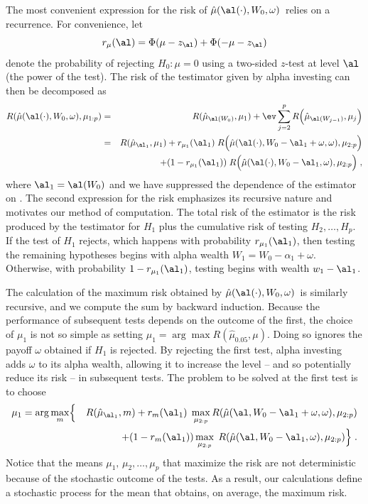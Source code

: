 \documentclass[12pt]{article}
\newcommand{\test}{\mbox{$\hat\mu(\al(\cdot),W_0,\omega)$}}
\begin{document}
 The most convenient expression for the risk of \test\ relies on a recurrence.
  For convenience, let
 \begin{equation}
   r_\mu(\al) = \Phi(\mu-z_\al)+\Phi(-\mu-z_\al)   
 \label{eq:rMu}
 \end{equation}
 denote the probability of rejecting $H_0: \mu=0$ using a two-sided $z$-test at
 level $\al$ (the power of the test).  The risk of the testimator given by alpha
 investing can then be decomposed as
 \begin{eqnarray}
   R(\hat\mu(\al(\cdot),W_0,\omega),\mu_{1:p}) 
    &=& R(\hat\mu_{\al(W_0)},\mu_1)
        + \ev \sum_{j=2}^p R\Bigl(\hat\mu_{\al(W_{j-1})},\mu_j\Bigr)  \cr
    &=& R(\hat\mu_{\al_1},\mu_1)
        + r_{\mu_1}(\al_1)\; 
          R\Bigl(\hat\mu(\al(\cdot),W_0-\al_1+\omega,\omega),\mu_{2:p}\Bigr)\cr
    & & \qquad + (1-r_{\mu_1}(\al_1))\; 
          R\Bigl(\hat\mu(\al(\cdot),W_0-\al_1,\omega),\mu_{2:p}\Bigr) \;,
 \label{eq:RMuHat}
 \end{eqnarray}
 where $\al_1 = \al(W_0)$ and we have suppressed the dependence of the estimator
 on \YY.  The second expression for the risk emphasizes its recursive nature and
 motivates our method of computation.  The total risk of the estimator is the
 risk produced by the testimator for $H_1$ plus the cumulative risk of testing
 $H_2, \ldots, H_p$.  If the test of $H_1$ rejects, which happens with
 probability $r_{\mu_1}(\al_1)$, then testing the remaining hypotheses begins
 with alpha wealth $W_1 = W_0 - \alpha_1 + \omega$.  Otherwise, with probability
 $1- r_{\mu_1}(\al_1)$, testing begins with wealth $w_1 - \al_1$.


 The calculation of the maximum risk obtained by \test\ is similarly recursive,
 and we compute the sum by backward induction.  Because the performance of
 subsequent tests depends on the outcome of the first, the choice of $\mu_1$ is
 not so simple as setting $\mu_1 = \arg \max R(\hat\mu_{0.05}, \mu)$.  Doing so
 ignores the payoff $\omega$ obtained if $H_1$ is rejected.  By rejecting the
 first test, alpha investing adds
 $\omega$ to its alpha wealth, allowing it to increase the level -- and so
 potentially reduce its risk -- in subsequent tests.  The problem to be solved
 at the first test is to choose
 \begin{eqnarray*}
    \mu_1 = \arg \max_{m} & \Bigl\{ & R(\hat\mu_{\al_1},m) \Bigr. 
        + r_{m}(\al_1) \; \max_{\mu_{2:p}} 
              R(\hat\mu(\al,W_0-\al_1+\omega,\omega),\mu_{2:p})\cr
    & & + \Bigl. (1-r_{m}(\al_1)) \max_{\mu_{2:p}} \; 
              R(\hat\mu(\al,W_0-\al_1,\omega),\mu_{2:p}) \Bigr\} \;.
 \end{eqnarray*}
 Notice that the means $\mu_1,\, \mu_2,\ldots, \mu_p$ that maximize the risk are
 not deterministic because of the stochastic outcome of the tests.  As a result,
 our calculations define a stochastic process for the mean that obtains, on
 average, the maximum risk.
\end{document}
